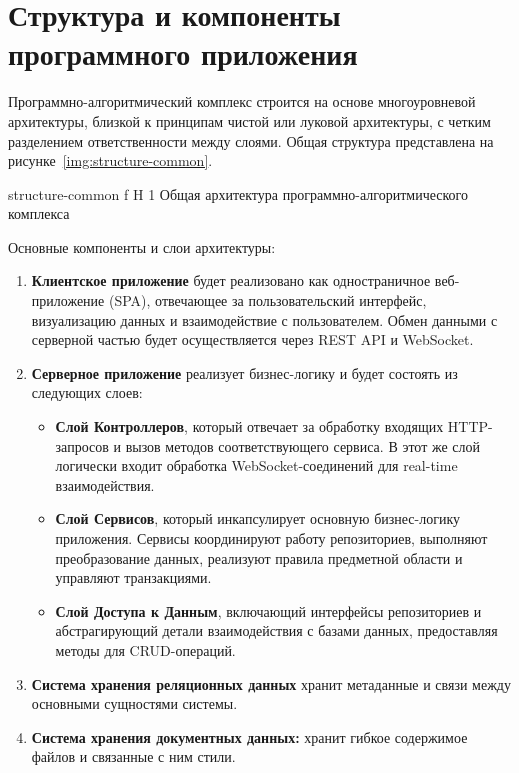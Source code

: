 \section{Структура и компоненты программного приложения}

Программно-алгоритмический комплекс строится на основе многоуровневой архитектуры, близкой к принципам чистой или луковой архитектуры, с четким разделением ответственности между слоями.
Общая структура представлена на рисунке~\ref{img:structure-common}.

	{structure-common}
	{f}
	{H}
	{1\textwidth}
	{Общая архитектура программно-алгоритмического комплекса}

\clearpage
Основные компоненты и слои архитектуры:

\begin{enumerate}[wide=12.5mm, leftmargin=12.5mm]
    \item \textbf{Клиентское приложение} будет реализовано как одностраничное веб-приложение (SPA), отвечающее за пользовательский интерфейс, визуализацию данных и взаимодействие с пользователем. Обмен данными с серверной частью будет осуществляется через REST API и WebSocket.
    \item \textbf{Серверное приложение} реализует бизнес-логику и будет состоять из следующих слоев:
        \begin{itemize}
            \item \textbf{Слой Контроллеров}, который отвечает за обработку входящих HTTP-запросов и вызов методов соответствующего сервиса. В этот же слой логически входит обработка WebSocket-соединений для real-time взаимодействия.
            \item \textbf{Слой Сервисов}, который инкапсулирует основную бизнес-логику приложения. Сервисы координируют работу репозиториев, выполняют преобразование данных, реализуют правила предметной области и управляют транзакциями.
            \item \textbf{Слой Доступа к Данным}, включающий интерфейсы репозиториев и абстрагирующий детали взаимодействия с базами данных, предоставляя методы для CRUD-операций.
        \end{itemize}
    \item \textbf{Система хранения реляционных данных} хранит метаданные и связи между основными сущностями системы.
    \item \textbf{Система хранения документных данных:} хранит гибкое содержимое файлов и связанные с ним стили.
\end{enumerate}

